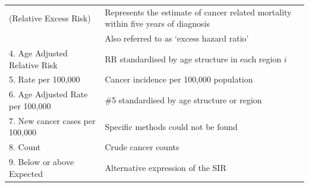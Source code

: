 \documentclass[11pt,]{article}
\begin{document}
\begin{longtable}[]{@{}ll@{}}
\begin{minipage}[t]{0.28\columnwidth}
(Relative Excess Risk)\strut
\end{minipage} & \begin{minipage}[t]{0.66\columnwidth}\raggedright
Represents the estimate of cancer related mortality within five years of
diagnosis\strut
\end{minipage}\tabularnewline
\begin{minipage}[t]{0.28\columnwidth}\raggedright
\strut
\end{minipage} & \begin{minipage}[t]{0.66\columnwidth}\raggedright
Also referred to as `excess hazard ratio'\strut
\end{minipage}\tabularnewline
\begin{minipage}[t]{0.28\columnwidth}\raggedright
4. Age Adjusted Relative Risk\strut
\end{minipage} & \begin{minipage}[t]{0.66\columnwidth}\raggedright
RR standardised by age structure in each region \(i\)\strut
\end{minipage}\tabularnewline
\begin{minipage}[t]{0.28\columnwidth}\raggedright
5. Rate per 100,000\strut
\end{minipage} & \begin{minipage}[t]{0.66\columnwidth}\raggedright
Cancer incidence per 100,000 population\strut
\end{minipage}\tabularnewline
\begin{minipage}[t]{0.28\columnwidth}\raggedright
6. Age Adjusted Rate per 100,000\strut
\end{minipage} & \begin{minipage}[t]{0.66\columnwidth}\raggedright
\#5 standardised by age structure or region\strut
\end{minipage}\tabularnewline
\begin{minipage}[t]{0.28\columnwidth}\raggedright
7. New cancer cases per 100,000\strut
\end{minipage} & \begin{minipage}[t]{0.66\columnwidth}\raggedright
Specific methods could not be found\strut
\end{minipage}\tabularnewline
\begin{minipage}[t]{0.28\columnwidth}\raggedright
8. Count\strut
\end{minipage} & \begin{minipage}[t]{0.66\columnwidth}\raggedright
Crude cancer counts\strut
\end{minipage}\tabularnewline
\begin{minipage}[t]{0.28\columnwidth}\raggedright
9. Below or above Expected\strut
\end{minipage} & \begin{minipage}[t]{0.66\columnwidth}\raggedright
Alternative expression of the SIR\strut
\end{minipage}\tabularnewline
\bottomrule
\end{longtable}
\end{document}
